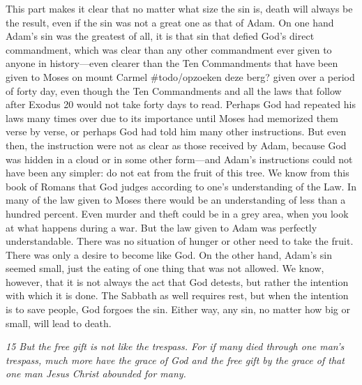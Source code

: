 This part makes it clear that no matter what size the sin is, death will
always be the result, even if the sin was not a great one as that of
Adam. On one hand Adam's sin was the greatest of all, it is that sin
that defied God's direct commandment, which was clear than any other
commandment ever given to anyone in history---even clearer than the Ten
Commandments that have been given to Moses on mount Carmel
\#todo/opzoeken deze berg? given over a period of forty day, even though
the Ten Commandments and all the laws that follow after Exodus 20 would
not take forty days to read. Perhaps God had repeated his laws many
times over due to its importance until Moses had memorized them verse by
verse, or perhaps God had told him many other instructions. But even
then, the instruction were not as clear as those received by Adam,
because God was hidden in a cloud or in some other form---and Adam's
instructions could not have been any simpler: do not eat from the fruit
of this tree. We know from this book of Romans that God judges according
to one's understanding of the Law. In many of the law given to Moses
there would be an understanding of less than a hundred percent. Even
murder and theft could be in a grey area, when you look at what happens
during a war. But the law given to Adam was perfectly understandable.
There was no situation of hunger or other need to take the fruit. There
was only a desire to become like God. On the other hand, Adam's sin
seemed small, just the eating of one thing that was not allowed. We
know, however, that it is not always the act that God detests, but
rather the intention with which it is done. The Sabbath as well requires
rest, but when the intention is to save people, God forgoes the sin.
Either way, any sin, no matter how big or small, will lead to death.

\emph{15 But the free gift is not like the trespass. For if many died
through one man's trespass, much more have the grace of God and the free
gift by the grace of that one man Jesus Christ abounded for many.}


